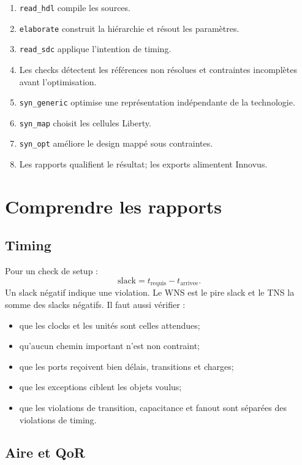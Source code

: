 \documentclass[11pt,a4paper,openany]{report}
\begin{document}
\begin{enumerate}
  \item \texttt{read\_hdl} compile les sources.
  \item \texttt{elaborate} construit la hiérarchie et résout les paramètres.
  \item \texttt{read\_sdc} applique l'intention de timing.
  \item Les checks détectent les références non résolues et contraintes
    incomplètes avant l'optimisation.
  \item \texttt{syn\_generic} optimise une représentation indépendante de la
    technologie.
  \item \texttt{syn\_map} choisit les cellules Liberty.
  \item \texttt{syn\_opt} améliore le design mappé sous contraintes.
  \item Les rapports qualifient le résultat; les exports alimentent Innovus.
\end{enumerate}

\chapter{Comprendre les rapports}

\section{Timing}

Pour un check de setup :
\[
  \mathrm{slack} = t_{\mathrm{requis}} - t_{\mathrm{arrivee}}.
\]
Un slack négatif indique une violation. Le WNS est le pire slack et le TNS la
somme des slacks négatifs. Il faut aussi vérifier :

\begin{itemize}
  \item que les clocks et les unités sont celles attendues;
  \item qu'aucun chemin important n'est non contraint;
  \item que les ports reçoivent bien délais, transitions et charges;
  \item que les exceptions ciblent les objets voulus;
  \item que les violations de transition, capacitance et fanout sont séparées
    des violations de timing.
\end{itemize}

\section{Aire et QoR}
\end{document}
